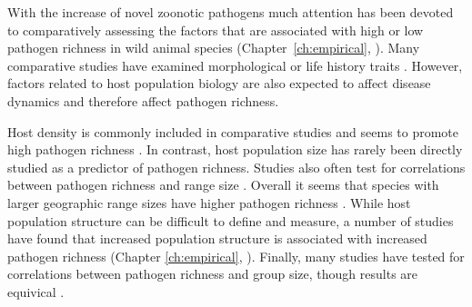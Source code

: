 





With the increase of novel zoonotic pathogens \cite{jones2008global} much attention has been devoted to comparatively assessing the factors that are associated with high or low pathogen richness in wild animal species (Chapter~\ref{ch:empirical}, \cites{poulin2000diversity, kamiya2014determines, luis2013comparison}).
Many comparative studies have examined morphological or life history traits \cite{kamiya2014determines, luis2013comparison}.
However, factors related to host population biology are also expected to affect disease dynamics and therefore affect pathogen richness.

Host density is commonly included in comparative studies and seems to promote high pathogen richness \cite{morand1998density, kamiya2014determines, lindenfors2007parasite, nunn2003comparative, arneberg2002host}.
In contrast, host population size has rarely been directly studied as a predictor of pathogen richness.
Studies also often test for correlations between pathogen richness and range size \cite{lindenfors2007parasite, nunn2003comparative, turmelle2009correlates, huang2015parasite, kamiya2014determines}.
Overall it seems that species with larger geographic range sizes have higher pathogen richness \cite{kamiya2014determines}.
While host population structure can be difficult to define and measure, a number of studies have found that increased population structure is associated with increased pathogen richness (Chapter \ref{ch:empirical}, \cites{maganga2014bat, turmelle2009correlates}).
Finally, many studies have tested for correlations between pathogen richness and group size, though results are equivical \cite{vitone2004body, gay2014parasite, ezenwa2006host, rifkin2012animals, nunn2003comparative}.


